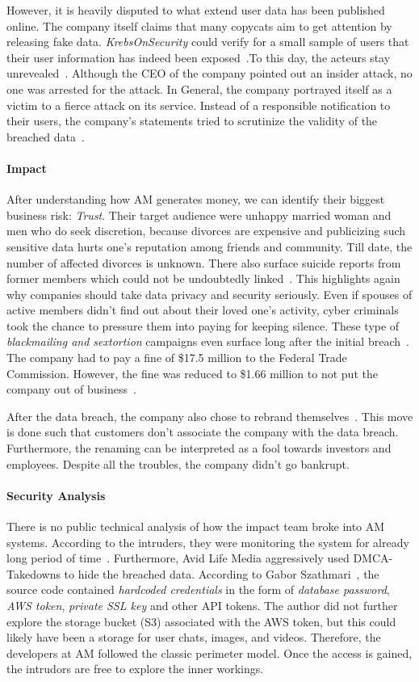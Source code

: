 \documentclass{homework}
\begin{document}
However, it is heavily disputed to what extend user data has been published online. The company itself claims that many copycats aim to get attention by releasing fake data. \emph{KrebsOnSecurity} could verify for a small sample of users that their user information has indeed been exposed~\cite{krebs1}.To this day, the acteurs stay unrevealed~\cite{krebs2}. Although the CEO of the company pointed out an insider attack, no one was arrested for the attack. In General, the company portrayed itself as a victim to a fierce attack on its service. Instead of a responsible notification to their users, the company’s statements tried to scrutinize the validity of the breached data~\cite{paper}.

\paragraph{\textbf{Impact}}After understanding how AM generates money, we can identify their biggest business risk: \emph{Trust}. Their target audience were unhappy married woman and men who do seek discretion, because divorces are expensive and publicizing such sensitive data hurts one’s reputation among friends and community. Till date, the number of affected divorces is unknown. There also surface suicide reports from former members which could not be undoubtedly linked~\cite{paper}. This highlights again why companies should take data privacy and security seriously. Even if spouses of active members didn’t find out about their loved one’s activity, cyber criminals took the chance to pressure them into paying for keeping silence. These type of \emph{blackmailing and sextortion} campaigns even surface long after the initial breach~\cite[Min. 9]{youtube}.
The company had to pay a fine of \$17.5 million to the Federal Trade Commission. However, the fine was reduced to \$1.66 million to not put the company out of business~\cite{theguardian}.

After the data breach, the company also chose to rebrand themselves~\cite{twitter}. This move is done such that customers don’t associate the company with the data breach. Furthermore, the renaming can be interpreted as a fool towards investors and employees. Despite all the troubles, the company didn't go bankrupt.

\paragraph{\textbf{Security Analysis}}There is no public technical analysis of how the impact team broke into AM systems. According to the intruders, they were monitoring the system for already long period of time~\cite{paper}. Furthermore, Avid Life Media aggressively used DMCA-Takedowns to hide the breached data. According to Gabor Szathmari~\cite{security1}, the source code contained \emph{hardcoded credentials} in the form of \emph{database password}, \emph{AWS token}, \emph{private SSL key} and other API tokens. The author did not further explore the storage bucket (S3) associated with the AWS token, but this could likely have been a storage for user chats, images, and videos. Therefore, the developers at AM followed the classic perimeter model. Once the access is gained, the intrudors are free to explore the inner workings.
\end{document}
